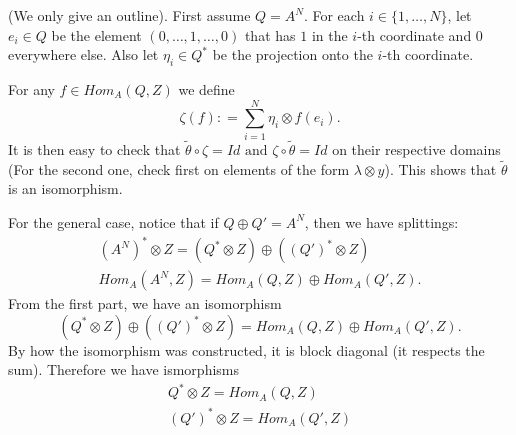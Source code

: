 \documentclass{ximera}
\begin{document}
\begin{solution}
    (We only give an outline).      First assume $Q=A^N$. For each $i \in \{ 1, \ldots , N \}$, let $e_i \in Q$ be the element $(0, \ldots , 1, \ldots , 0)$ that has $1$ in the $i$-th coordinate and $0$ everywhere else. Also let $\eta _i \in Q ^{\ast} $ be the projection onto the $i$-th coordinate. 

    For any $f \in Hom _A (Q,Z)$ we define 
    \[   \zeta (f) : = \sum _{i = 1} ^N \eta _i \otimes f(e_i) .                 \]
    It is then easy to check that   $     \tilde{\theta} \circ \zeta = Id \text{ and }   \zeta \circ \tilde{\theta} = Id $      on their respective domains (For the second one, check first on elements of the form $\lambda \otimes y$). This shows that $\tilde{\theta}$ is an isomorphism.

    For the general case, notice that if $Q \oplus Q ' = A ^N$, then we have splittings:
    \begin{gather*}
        (A^N)^{\ast} \otimes Z = (Q ^{\ast} \otimes Z ) \oplus ((Q')^{\ast} \otimes Z) \\
        Hom _A (A^N , Z) = Hom _A(Q, Z) \oplus Hom_A (Q' , Z). 
    \end{gather*}
    From the first part, we have an isomorphism 
    \[   (Q ^{\ast} \otimes Z ) \oplus ((Q') ^{\ast} \otimes Z)  =   Hom _A(Q, Z) \oplus Hom_A (Q' , Z)  .  \]
    By how the isomorphism was constructed, it is block diagonal (it respects the sum). Therefore we have ismorphisms
    \begin{gather*} Q^{\ast} \otimes Z   =   Hom _A(Q, Z) \\
    (Q')^{\ast} \otimes Z   =   Hom _A(Q', Z)
    \end{gather*}
    

    
\end{solution}
\end{document}
